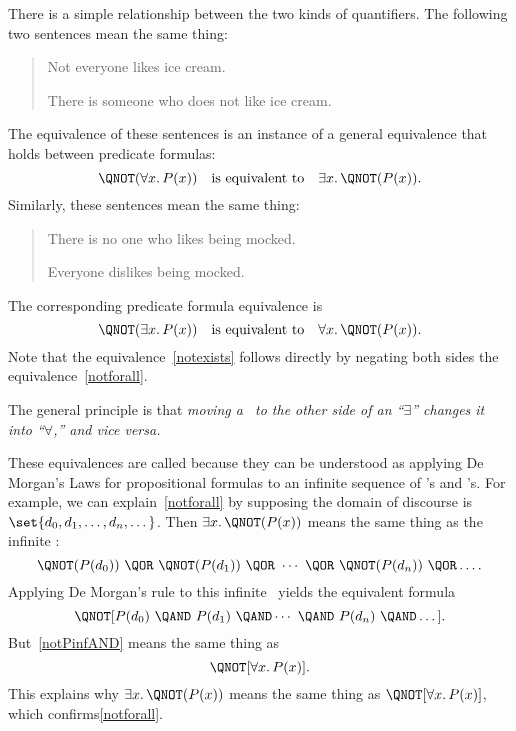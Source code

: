 There is a simple relationship between the two kinds of quantifiers.  The
following two sentences mean the same thing:
\begin{quote}
Not everyone likes ice cream.

There is someone who does not like ice cream.
\end{quote}
The equivalence of these sentences is an instance of a general
equivalence that holds between predicate formulas:
%
\begin{equation}\label{notforall}
\QNOT(\forall x.\, P(x))
\quad \text{is equivalent to} \quad
\exists x.\, \QNOT(P(x)).
\end{equation}
%
Similarly, these sentences mean the same thing:
%
\begin{quote}
There is no one who likes being mocked.

Everyone dislikes being mocked.
\end{quote}
The corresponding predicate formula equivalence is
\begin{equation}\label{notexists}
\QNOT(\exists x.\, P(x))
\quad \text{is equivalent to} \quad
\forall x.\, \QNOT(P(x)).
\end{equation}
Note that the equivalence~\eqref{notexists} follows directly by
negating both sides the equivalence~\eqref{notforall}.

The general principle is that \emph{moving a \QNOT\ to the other side
  of an ``$\exists$'' changes it into ``$\forall$,'' and \emph{vice
    versa}.}

These equivalences are called 
because they can be understood as applying De Morgan's Laws for
propositional formulas to an infinite sequence of \QAND's and \QOR's.
For example, we can explain~\eqref{notforall} by supposing the domain
of discourse is $\set{d_0,d_1,\dots,d_n,\dots}$.  Then $\exists x.\,
\QNOT(P(x))$ means the same thing as the infinite \QOR:
\begin{equation}\label{notPinfOR}
\QNOT(P(d_0))\ \QOR\ \QNOT(P(d_1))\ \QOR\ \cdots\ \QOR\ \QNOT(P(d_n))\ \QOR \dots.
\end{equation}
Applying De Morgan's rule to this infinite \QOR\ yields the equivalent formula
\begin{equation}\label{notPinfAND}
\QNOT[P(d_0)\ \QAND\ P(d_1)\ \QAND \cdots\ \QAND\ P(d_n)\ \QAND \dots].
\end{equation}
But~\eqref{notPinfAND} means the same thing as
\[
\QNOT[\forall x.\, P(x)].
\]
This explains why $\exists x.\, \QNOT(P(x))$ means the same thing as
$\QNOT[\forall x.\, P(x)]$, which confirms\eqref{notforall}.

